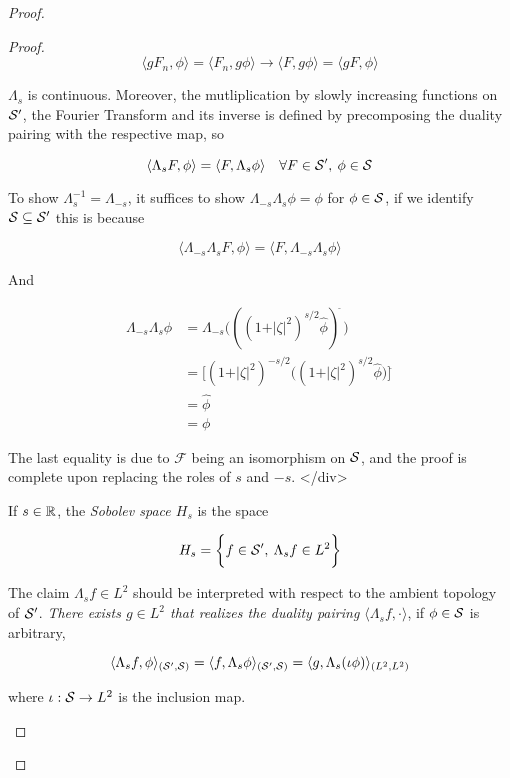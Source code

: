 \documentclass[../main-manifolds.tex]{subfiles}
\begin{document}
{{\begin{proof}
{{\begin{proof}
$$
\langle g F_n,\phi\rangle = \langle F_n, g\phi\rangle\longrightarrow \langle F,g\phi\rangle = \langle g F,\phi\rangle
$$

$\Lambda_s$ is continuous. Moreover, the mutliplication by slowly increasing functions on $\mathcal{S}'$, the Fourier Transform and its inverse is defined by precomposing the duality pairing with the respective map, so 

$$
\langle \Lambda_s F,\phi\rangle = \langle F,\Lambda_s\phi\rangle\quad\forall F\in\mathcal{S}',\: \phi\in\mathcal{S}
$$


To show $\Lambda_s^{-1} = \Lambda_{-s}$, it suffices to show $\Lambda_{-s}\Lambda_{s}\phi = \phi$ for $\phi\in \mathcal{S}$, if we identify $\mathcal{S}\subseteq\mathcal{S}'$ this is because

$$
\langle\Lambda_{-s}\Lambda_{s}F,\phi\rangle = \langle F,\Lambda_{-s}\Lambda_{s}\phi\rangle
$$

And

$$
\begin{align}
\Lambda_{-s}\Lambda_s\phi &= \Lambda_{-s}\biggl(((1+\vert\zeta\vert^2)^{s/2}\hat{\phi})^{\breve{\:}}\biggr)\\
&= \biggl[(1+\vert\zeta\vert^2)^{-s/2}\biggl((1+\vert\zeta\vert^2)^{s/2}\hat{\phi}\biggr)\biggr]^{\breve{\:}}\\
&= \hat{\phi}^{\breve{\:}}\\
&= \phi
\end{align}
$$

The last equality is due to $\mathcal{F}$ being an isomorphism on $\mathcal{S}$, and the proof is complete upon replacing the roles of $s$ and $-s$.
</div>

\begin{definition}
If $s\in\mathbb{R}$, the \emph{Sobolev space $H_s$} is the space

$$
H_s = \biggl\{{f\in \mathcal{S}',\: \Lambda_sf\in L^2}\biggr\}
$$

The claim $\Lambda_sf\in L^2$ should be interpreted with respect to the ambient topology of $\mathcal{S}'$. \emph{There exists $g\in L^2$ that realizes the duality pairing $\langle \Lambda_s f, \cdot\rangle$}, if $\phi\in\mathcal{S}$ is arbitrary, 

$$
\langle \Lambda_s f,\phi\rangle_{(\mathcal{S}',\mathcal{S})} = \langle f, \Lambda_s \phi\rangle_{(\mathcal{S}',\mathcal{S})} = \langle g, \Lambda_s (\iota\phi)\rangle_{(L^2,L^2)} 
$$

where $\iota: \mathcal{S}\to L^2$ is the inclusion map.

\end{definition}


\end{proof}}}
\end{proof}}}
\end{document}
